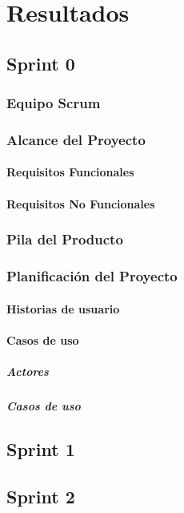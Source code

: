 \chapter{Resultados}
\label{cap:Resultados}

\section{Sprint 0}
\label{sec:Sprint0}

\subsection{Equipo Scrum}
\label{sec:EquipoScrum}

\subsection{Alcance del Proyecto}
\label{sec:Alcance}

\subsubsection{Requisitos Funcionales}
\label{sec:RequisitosFuncionales}

\subsubsection{Requisitos No Funcionales}
\label{sec:RequisitosNoFuncionales}

\subsection{Pila del Producto}
\label{sec:PilaProducto}

\subsection{Planificación del Proyecto}
\label{sec:Planificacion}

\subsubsection{Historias de usuario}
\label{sec:HistoriasUsuario}

\subsubsection{Casos de uso}
\label{sec:CasosUso}

\paragraph{Actores}
\label{par:Actores}

\paragraph{Casos de uso}
\label{par:CasosdeUso}

\section{Sprint 1}
\label{sec:Sprint1}

\section{Sprint 2}
\label{sec:Sprint2}